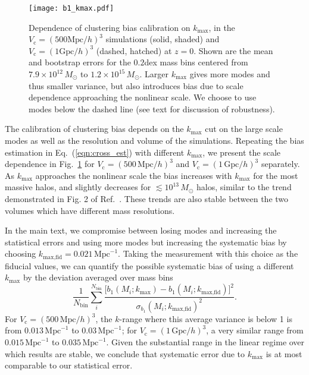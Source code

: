 \documentclass[prd,twocolumn,amsmath,amssymb,floatfix,superscriptaddress]{revtex4-1}
\newcommand{\VL}{V_\textrm{c}}
\begin{document}
\begin{figure}[tb]
    \centering
    \texttt{[image: b1\_kmax.pdf]}
    \caption{\footnotesize
        Dependence of clustering bias calibration on $k_\textrm{max}$,
        in the $\VL=(500\textrm{Mpc}/h)^3$ simulations (solid, shaded) and $\VL=(1\textrm{Gpc}/h)^3$ (dashed, hatched)
        at $z=0$. Shown are the mean and bootstrap errors for the $0.2$dex
        mass bins centered from $7.9\times10^{12}\,M_\odot$ to $1.2\times10^{15}\,M_\odot$.
        Larger $k_\textrm{max}$ gives more modes and thus smaller variance,
        but also introduces bias due to scale dependence approaching the nonlinear scale.
        We choose to use modes below the dashed line (see text for discussion of 
        robustness).      }
    \label{fig:b1_kmax}
\end{figure}

The calibration of clustering bias depends on the $k_\textrm{max}$ cut on
the large scale modes as well as the resolution and volume of the simulations.
 Repeating the bias estimation in Eq.~(\ref{eqn:cross_est})
with different $k_\textrm{max}$, we present the scale dependence in Fig.~\ref{fig:b1_kmax}
for $\VL=(500\,\textrm{Mpc}/h)^3$ and $\VL=(1\,\textrm{Gpc}/h)^3$ separately.
As $k_\textrm{max}$ approaches
the nonlinear scale the bias increases with $k_\textrm{max}$
for the most massive halos, and slightly decreases for $\lesssim 10^{13}\,M_\odot$ halos,
similar to the trend demonstrated in Fig. 2 of Ref.~\cite{NishizawaEtal13}.  These trends
are also stable between the two volumes which have different mass resolutions.

In the main text, we compromise between losing modes and increasing the statistical
errors and using more modes but increasing the systematic bias by choosing $k_\textrm{max,fid}=0.021\,\textrm{Mpc}^{-1}$.
Taking the measurement with this choice as the fiducial values, we can quantify the possible systematic bias
of using a different $k_\textrm{max}$ by the deviation averaged over mass bins
\begin{equation}
    \frac{1}{N_\textrm{bin}} \sum_i^{N_\textrm{bin}}
    \frac{\big[ b_1(M_i; k_\textrm{max}) - b_1(M_i; k_\textrm{max,fid})\big]^2}
        {\sigma_{b_1}(M_i; k_\textrm{max,fid})^2}.
    \label{eqn:poorstats}
\end{equation}
For $\VL=(500\,\textrm{Mpc}/h)^3$, 
the $k$-range where this average variance is below 1 is
from $0.013\,\textrm{Mpc}^{-1}$ to $0.03\,\textrm{Mpc}^{-1}$;
for $\VL=(1\,\textrm{Gpc}/h)^3$, a very similar range
from $0.015\,\textrm{Mpc}^{-1}$ to $0.035\,\textrm{Mpc}^{-1}$.
Given the substantial range in the linear regime over which results are stable, we conclude that systematic error
due to $k_\textrm{max}$ is at most comparable to our statistical error.
\end{document}
